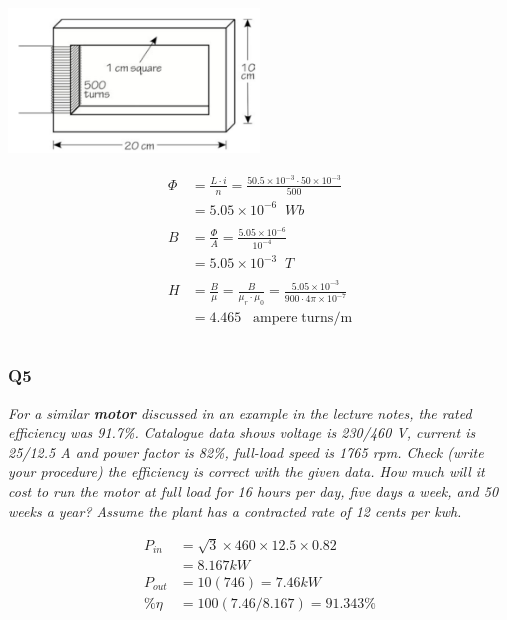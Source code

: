 \documentclass[a4paper,11pt]{article}
\begin{document}
\includegraphics[width=0.5\textwidth]{core.png}

\begin{align*}
    \Phi & = \frac{L\cdot i}{n} = \frac{50.5\times10^{-3} \cdot 50 \times 10^{-3}}{500}                           \\&= 5.05\times10^{-6}\;\;Wb\\\\
    B    & = \frac{\Phi}{A} = \frac{5.05\times10^{-6}}{10^{-4}}                                                   \\
         & = 5.05\times10^{-3} \;\;T                                                                              \\\\
    H    & = \frac{B}{\mu} = \frac{B}{\mu_r \cdot \mu_0} = \frac{5.05\times10^{-3}}{900 \cdot 4\pi\times 10^{-7}} \\
         & = 4.465 \;\;\;\mathrm{ampere \; turns/m}                                                               \\\\
\end{align*}



\subsubsection*{Q5}
\textit{For a similar \textbf{motor} discussed in an example in the lecture notes, the rated efficiency was 91.7\%. Catalogue data shows voltage is 230/460 V, current is 25/12.5 A and power factor is 82\%, full-load speed is 1765 rpm. Check (write your procedure) the efficiency is correct with the given data. How much will it cost to run the motor at full load for 16 hours per day, five days a week, and 50 weeks a year? Assume the plant has a contracted rate of 12 cents per kwh.}

\begin{align*}
    P_{in} & =\sqrt{3}\times460\times12.5\times0.82 \\
           & = 8.167kW \\
    P_{out} &= 10(746) = 7.46kW \\
    \%\eta &= 100(7.46/8.167)=91.343\%
\end{align*}
\end{document}
